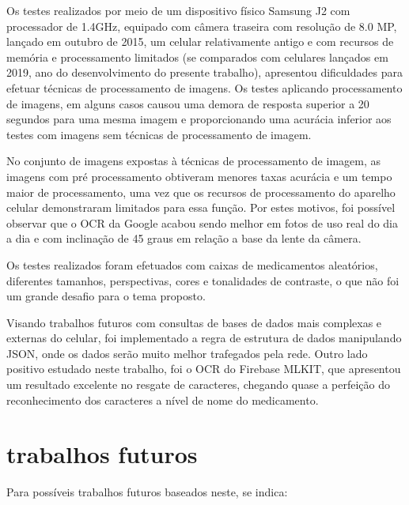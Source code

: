 Os testes realizados por meio de um dispositivo físico Samsung J2 com processador de 1.4GHz, equipado com câmera traseira com resolução de 8.0 MP, lançado em outubro de 2015, um celular relativamente antigo e com recursos de memória e processamento limitados (se comparados com celulares lançados em 2019, ano do desenvolvimento do presente trabalho), apresentou dificuldades para efetuar técnicas de processamento de imagens. Os testes aplicando processamento de imagens, em alguns casos causou uma demora de resposta superior a 20 segundos para uma mesma imagem e proporcionando uma acurácia inferior aos testes com imagens sem técnicas de processamento de imagem.

No conjunto de imagens expostas à técnicas de processamento de imagem, as imagens com pré processamento obtiveram menores taxas acurácia e um tempo maior de processamento, uma vez que os recursos de processamento do aparelho celular demonstraram limitados para essa função. Por estes motivos, foi possível observar que o OCR da Google acabou sendo melhor em fotos de uso real do dia a dia e com inclinação de 45 graus em relação a base da lente da câmera.

Os testes realizados foram efetuados com caixas de medicamentos aleatórios, diferentes tamanhos, perspectivas, cores e tonalidades de contraste, o que não foi um grande desafio para o tema proposto. 

Visando trabalhos futuros com consultas de bases de dados mais complexas e externas do celular, foi implementado a regra de estrutura de dados manipulando JSON, onde os dados serão muito melhor trafegados pela rede. Outro lado positivo estudado neste trabalho, foi o OCR do Firebase MLKIT, que apresentou um resultado excelente no resgate de caracteres, chegando quase a perfeição do reconhecimento dos caracteres a nível de nome do medicamento.

\section{trabalhos futuros}


Para possíveis trabalhos futuros baseados neste, se indica:

